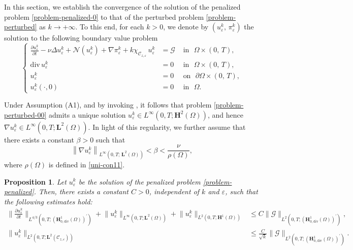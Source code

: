 \documentclass[a4paper,12pt,reqno,natbib]{amsart}
\newtheorem{proposition}[theorem]{Proposition}
\def\N{\mathcal N}
\def\H{\textbf{H}}
\def\L{\textbf{L}}
\def\div{\text{div}}
\begin{document}
In this section, we establish the convergence of the solution of the penalized problem \eqref{problem-penalized-0} to that of the perturbed problem \eqref{problem-perturbed} as \( k \to +\infty \). To this end, for each \( k > 0 \), we denote by \( (u_\varepsilon^k,\, \pi_\varepsilon^k) \) the solution to the following boundary value problem
\begin{equation}\label{problem-penalized}
\left\{
\begin{array}{rll}
\displaystyle \frac {\partial u_\varepsilon^k}{\partial t}-\nu
\Delta u_\varepsilon^k+ \N(u_\varepsilon^k)+ \nabla \pi_\varepsilon^k
 +k\chi_{\mathcal{C}_{z,\varepsilon}}\, u_\varepsilon^k&= \mathcal{G} &\mbox{ in }  \,\,\Omega\times (0,\,T) ,\\
\mbox{div}\, u_\varepsilon^k &=  0 & \mbox{ in } \,\, \Omega \times (0,\,T) ,\\
u_\varepsilon^k &= 0 & \mbox{ on }\,\,  \partial\Omega \times (0,\,T) , \\
u_\varepsilon^k(\cdot,0)&= 0&\mbox{ in } \,\,  \Omega.
\end{array}
 \right.
\end{equation}


Under Assumption (A1), and by invoking \cite[Theorem 3.8]{temam1973theory}, it follows that problem \eqref{problem-perturbed-00} admits a unique solution \( u_\varepsilon^k \in L^\infty(0,T;\H^2(\Omega)) \), and hence \( \nabla u_\varepsilon^k \in L^\infty(0,T;\L^2(\Omega)) \). In light of this regularity, we further assume that there exists a constant \( \beta > 0 \) such that
\begin{equation}\label{condition-uvarepsilon}
    \left\|\nabla u_\varepsilon^k\right\|_{L^\infty(0,T;\,\L^2(\Omega))} <\beta<  \frac{\nu}{\rho(\Omega)},
\end{equation}
where \( \rho(\Omega) \) is defined in \eqref{uni-con11}.


\begin{proposition}\label{proposition-bounded}
Let $u_\varepsilon^k$ be the solution of the penalized problem \eqref{problem-penalized}. Then, there exists a constant $C>0$, independent of $k$ and $\varepsilon$, such that the following estimates hold:
    \begin{align} \label{ennq1}\big\|\frac{\partial u_\varepsilon^k}{\partial t}\big\|_{L^{4/3}(0,T;(\H^1_{0,\text{div}}(\Omega))^\prime)}+\big\|u_\varepsilon^k\big\|_{L^\infty(0,T;\L^2(\Omega))}+\big\|u_\varepsilon^k\big\|_{L^2(0,T;\H^1(\Omega))}&\leq C  \big\| \mathcal{G} \big\|_{L^2(0,T;(\H^1_{0,\div}(\Omega))^\prime)},\\
    \label{ennq2}\big\| u_\varepsilon^k \big\|_{L^2(0,T;\L^2(\mathcal{C}_{z,\varepsilon}))}&\leq \frac{C}{\sqrt{k}}\big\| \mathcal{G} \big\|_{L^2(0,T;(\H^1_{0,\div}(\Omega))^\prime)}.
    \end{align}
\end{proposition}
\end{document}
